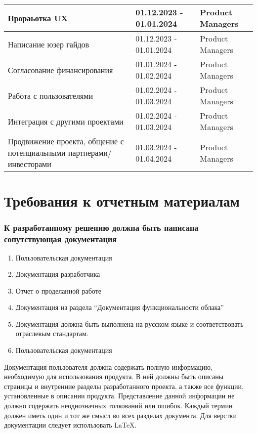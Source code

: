 \documentclass[14pt, a4paper]{extarticle}
\begin{document}
\begin{center}
\begin{longtable}{|D{0.4\textwidth}|D{0.2\textwidth}|D{0.3\textwidth}|}
\hline
Прораьотка UX & 01.12.2023 - 01.01.2024 & Product Managers \\
\hline
Написание юзер гайдов & 01.12.2023 - 01.01.2024 & Product Managers \\
\hline
Согласование финансирования & 01.01.2024 - 01.02.2024 & Product Managers \\
\hline
Работа с пользователями & 01.02.2024 - 01.03.2024 & Product Managers \\
\hline
Интеграция с другими проектами & 01.02.2024 - 01.03.2024 & Product Managers \\
\hline
Продвижение проекта, общение с потенциальными партнерами/инвесторами & 01.03.2024 - 01.04.2024 & Product Managers \\
\hline
\end{longtable}
\end{center}


\pagebreak

\section{Требования к отчетным материалам}

\subsubsection*{К разработанному решению должна быть написана сопутствующая документация}

\begin{enumerate}
\item Пользовательская документация
\item Документация разработчика
\item Отчет о проделанной работе
\item Документация из раздела “Документация функциональности облака”
\item Документация должна быть выполнена на русском языке и соответствовать отраслевым стандартам.
\item Пользовательская документация
\end{enumerate}

Документация пользователя должна содержать полную информацию, необходимую для использования про­дукта. В ней должны быть описаны страницы и внутренние разделы разработанного проекта, а также все функции, установленные в описании продукта. Представление данной информации не должно содержать неоднозначных толкований или ошибок. Каждый термин должен иметь один и тот же смысл во всех разделах документа.
Для верстки документации следует использовать LaTeX.
\end{document}
